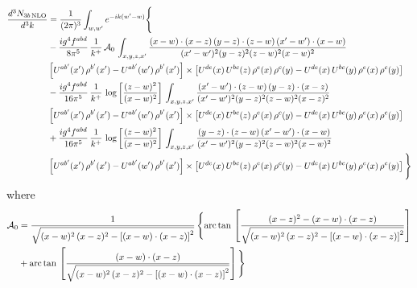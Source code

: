 \documentclass[10pt]{article}
\numberwithin{equation}{section}
\begin{document}
\begin{align}
\frac{d^{3}N_{3b\,\rm NLO}}{d^{3}k} & = \frac{1}{(2\pi)^{3}}\int_{w,w'}e^{-ik(w'-w)}\Bigg\{\notag \\
&-\frac{ig^{4}f^{abd}}{8\pi^{5}}\,\frac{1}{k^{+}}\,\mathcal{A}_{0}\,\int_{x,y,z,x'}
\frac{(x-w)\cdot(x-z)\,(y-z)\cdot(z-w)\,(x'-w')\cdot(x-w)}{(x'-w')^{2}(y-z)^{2}(z-w)^{2}(x-w)^{2}}\notag \\ & \left[U^{ab'}(x')\,\rho^{b'}(x')-U^{ab'}(w')\, \rho^{b'}(x')\right]\times \left[U^{de}(x)\,U^{bc}(z)\, \rho^{e}(x)\,\rho^{c}(y)-U^{de}(x)\,U^{bc}(y)\,\rho^{e}(x)\,\rho^{c}(y)\right] \notag \\
& -\frac{ig^{4}f^{abd}}{16\pi^{5}}\,\frac{1}{k^{+}}\,\log{\left[\frac{(z-w)^{2}}{(x-w)^{2}}\right]}\,\int_{x,y,z,x'}
\frac{(x'-w')\cdot(z-w)\,(y-z)\cdot(x-z)}{(x'-w')^{2}(y-z)^{2}(z-w)^{2}(x-z)^{2}}\notag \\
&\left[U^{ab'}(x')\,\rho^{b'}(x')-U^{ab'}(w')\, \rho^{b'}(x')\right]\times \left[U^{de}(x)\,U^{bc}(z)\, \rho^{e}(x)\,\rho^{c}(y)-U^{de}(x)\,U^{bc}(y)\,\rho^{e}(x)\,\rho^{c}(y)\right] \notag \\
&+ \frac{ig^{4}f^{abd}}{16\pi^{5}}\,\frac{1}{k^{+}}\,\log{\left[\frac{(z-w)^{2}}{(x-w)^{2}}\right]}\,\int_{x,y,z,x'}
\frac{(y-z)\cdot(z-w)\,(x'-w')\cdot(x-w)}{(x'-w')^{2}(y-z)^{2}(z-w)^{2}(x-w)^{2}}\notag \\ 
& \left[U^{ab'}(x')\,\rho^{b'}(x')-U^{ab'}(w')\, \rho^{b'}(x')\right]\times \left[U^{de}(x)\,U^{bc}(z)\, \rho^{e}(x)\,\rho^{c}(y)-U^{de}(x)\,U^{bc}(y)\,\rho^{e}(x)\,\rho^{c}(y)\right]\Bigg\}
\end{align}
where
\begin{align}
\mathcal{A}_{0} & = \frac{1}{\sqrt{(x-w)^{2}\,(x-z)^{2}-\left[(x-w)\cdot (x-z)\right]^{2}}}\, \Bigg\{\mathrm{arc\,tan}\,\left[\frac{(x-z)^{2}-(x-w)\cdot (x-z)}{\sqrt{(x-w)^{2}\,(x-z)^{2}-\left[(x-w)\cdot (x-z)\right]^{2}}}\right]\notag \\ & + \mathrm{arc\,tan}\,\left[\frac{(x-w)\cdot (x-z)}{\sqrt{(x-w)^{2}\,(x-z)^{2}-\left[(x-w)\cdot (x-z)\right]^{2}}}\right] \Bigg\}
\end{align}
\end{document}
